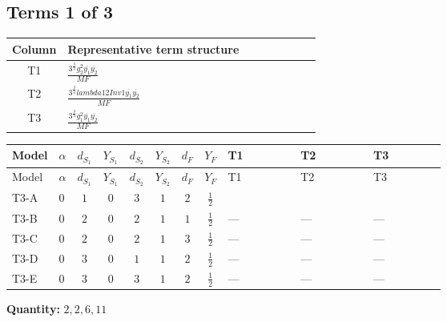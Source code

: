 \documentclass[8pt]{article}
\begin{document}
\begin{landscape}
\subsection*{Terms 1 of 3}
\begin{center}
\begin{tabular}{@{}c >{\raggedright\arraybackslash}p{0.82\linewidth}@{}}
\toprule
Column & Representative term structure \\
\midrule
T1 & \(\displaystyle \frac{3^{\frac{3}{4}} g_{2}^{2} \overline{y_{1}} \overline{y_{2}}}{MF}\) \\
\midrule
T2 & \(\displaystyle \frac{3^{\frac{3}{4}} lambda12Inv1 \overline{y_{1}} \overline{y_{2}}}{MF}\) \\
\midrule
T3 & \(\displaystyle \frac{3^{\frac{3}{4}} g_{1}^{2} \overline{y_{1}} \overline{y_{2}}}{MF}\) \\
\midrule
\bottomrule
\end{tabular}
\end{center}
\smallskip
\tiny
\begin{longtable}{@{}llcccccc >{\raggedright\arraybackslash}p{0.21\linewidth} >{\raggedright\arraybackslash}p{0.21\linewidth} >{\raggedright\arraybackslash}p{0.21\linewidth}@{}}
\toprule
Model & $\alpha$ & $d_{S_1}$ & $Y_{S_1}$ & $d_{S_2}$ & $Y_{S_2}$ & $d_F$ & $Y_F$ & T1 & T2 & T3 \\
\midrule
\endfirsthead
\toprule
Model & $\alpha$ & $d_{S_1}$ & $Y_{S_1}$ & $d_{S_2}$ & $Y_{S_2}$ & $d_F$ & $Y_F$ & T1 & T2 & T3 \\
\midrule
\endhead
T3-A & $0$ & $1$ & $0$ & $3$ & $1$ & $2$ & $\frac{1}{2}$ & \scriptsize\adjustbox{max width=\linewidth}{$\begin{gathered} - \frac{11 \cdot 3^{\frac{3}{4}} g_{2}^{2} \overline{y_{1}} \overline{y_{2}}}{8 MF}\end{gathered}$} & \scriptsize\adjustbox{max width=\linewidth}{$\begin{gathered} - \frac{3^{\frac{3}{4}} lambda12Inv1 \overline{y_{1}} \overline{y_{2}}}{6 MF}\end{gathered}$} & \scriptsize\adjustbox{max width=\linewidth}{$\begin{gathered} - \frac{3^{\frac{3}{4}} g_{1}^{2} \overline{y_{1}} \overline{y_{2}}}{8 MF}\end{gathered}$} \\
\midrule
T3-B & $0$ & $2$ & $0$ & $2$ & $1$ & $1$ & $\frac{1}{2}$ & --- & --- & --- \\
\midrule
T3-C & $0$ & $2$ & $0$ & $2$ & $1$ & $3$ & $\frac{1}{2}$ & --- & --- & --- \\
\midrule
T3-D & $0$ & $3$ & $0$ & $1$ & $1$ & $2$ & $\frac{1}{2}$ & --- & --- & --- \\
\midrule
T3-E & $0$ & $3$ & $0$ & $3$ & $1$ & $2$ & $\frac{1}{2}$ & --- & --- & --- \\
\midrule
\bottomrule
\end{longtable}
\clearpage
\noindent\textbf{Quantity: }$\mathrm{2,2,6,11}$\par\smallskip

\end{landscape}
\end{document}
